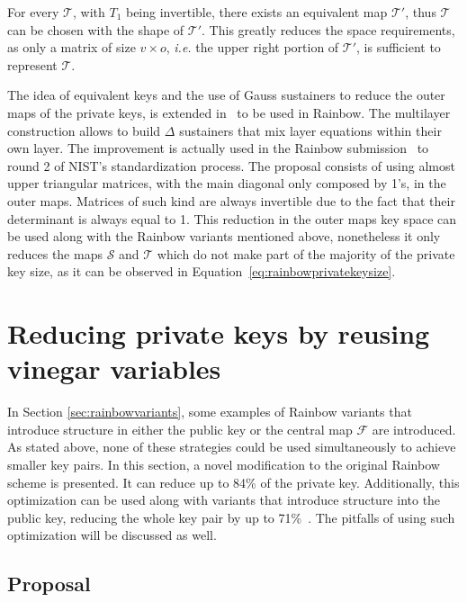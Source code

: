 \documentclass{ufsctex/ufsctex}
\begin{document}
For every $\mathcal{T}$, with $T_1$ being invertible, there exists an
equivalent map $\mathcal{T'}$, thus $\mathcal{T}$ can be chosen with the shape
of $\mathcal{T'}$. This greatly reduces the space requirements, as only a
matrix of size $v \times o$, \textit{i.e.} the upper right portion of
$\mathcal{T'}$, is sufficient to represent $\mathcal{T}$.

The idea of equivalent keys and the use of Gauss sustainers to reduce the outer
maps of the private keys, is extended in~\cite[Chapter 3.5]{petzoldt2013thesis}
to be used in Rainbow. The multilayer construction allows to build $\Delta$
sustainers that mix layer equations within their own layer. The improvement is
actually used in the Rainbow submission~\cite{ding2019nist} to round 2 of
NIST's standardization process. The proposal consists of using almost upper
triangular matrices, with the main diagonal only composed by 1's, in the outer
maps. Matrices of such kind are always invertible due to the fact that their
determinant is always equal to 1. This reduction in the outer maps key space
can be used along with the Rainbow variants mentioned above, nonetheless it
only reduces the maps $\mathcal{S}$ and $\mathcal{T}$ which do not make part of
the majority of the private key size, as it can be observed in
Equation~\ref{eq:rainbowprivatekeysize}.

\chapter{Reducing private keys by reusing vinegar variables}

In Section \ref{sec:rainbowvariants}, some examples of Rainbow variants that
introduce structure in either the public key or the central map $\mathcal{F}$
are introduced. As stated above, none of these strategies could be used
simultaneously to achieve smaller key pairs. In this section, a novel
modification to the original Rainbow scheme is presented. It can reduce up to
84\% of the private key. Additionally, this optimization can be used along with
variants that introduce structure into the public key, reducing the whole key
pair by up to 71\%~\cite{zambonin2019handling}. The pitfalls of using such
optimization will be discussed as well.

\section{Proposal}\label{sec:proposal}
\end{document}
